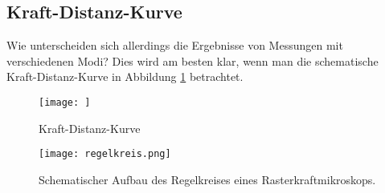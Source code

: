 




\subsection{Kraft-Distanz-Kurve}
Wie unterscheiden sich allerdings die Ergebnisse von Messungen mit verschiedenen Modi? Dies wird am besten klar, wenn man die schematische Kraft-Distanz-Kurve in Abbildung \ref{fig:Fz} betrachtet. 

\begin{figure}[h]
	\centering
	\texttt{[image: ]}
	\caption{Kraft-Distanz-Kurve}
	\label{fig:Fz}
\end{figure}









\begin{figure}[h]
	\centering
	\texttt{[image: regelkreis.png]}
	\caption{Schematischer Aufbau des Regelkreises eines Rasterkraftmikroskops.}
	\label{fig:feedback}
\end{figure}

\subsection{}